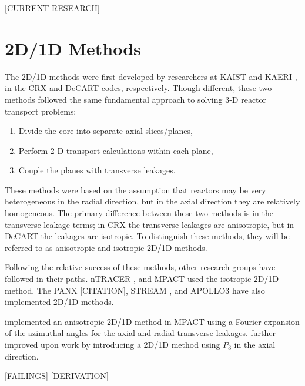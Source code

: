 {{    [CURRENT RESEARCH]
  }

  
  
  

  \section{2D/1D Methods}{\label{sec:3T:2D/1D Methods}
    The 2D/1D methods were first developed by researchers at \ac{KAIST} \cite{Cho2002} and \ac{KAERI} \cite{DeCART}, in the CRX and DeCART codes, respectively.
    Though different, these two methods followed the same fundamental approach to solving 3-D reactor transport problems:
    \begin{enumerate}
      \item{Divide the core into separate axial slices/planes,}
      \item{Perform 2-D transport calculations within each plane,}
      \item{Couple the planes with transverse leakages.}
    \end{enumerate}
    These methods were based on the assumption that reactors may be very heterogeneous in the radial direction, but in the axial direction they are relatively homogeneous.
    The primary difference between these two methods is in the transverse leakage terms; in CRX the transverse leakages are anisotropic, but in DeCART the leakages are isotropic.
    To distinguish these methods, they will be referred to as anisotropic and isotropic 2D/1D methods.

    Following the relative success of these methods, other research groups have followed in their paths.
    nTRACER \cite{Jung2009}, and MPACT \cite{MPACT2016} used the isotropic 2D/1D method.
    The PANX [CITATION], STREAM \cite{Zheng2017}, and APOLLO3 \cite{Faure2018} have also implemented 2D/1D methods.

    \citet{Stimpson2015} implemented an anisotropic 2D/1D method in MPACT using a Fourier expansion of the azimuthal angles for the axial and radial transverse leakages.
    \citet{Jarrett2018} further improved upon  work by introducing a 2D/1D method using $P_3$ in the axial direction.

    [FAILINGS]
    [DERIVATION]






}}
